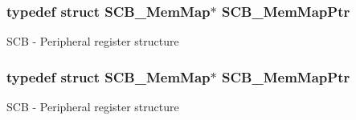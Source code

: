 \subsubsection[{\texorpdfstring{S\+C\+B\+\_\+\+Mem\+Map\+Ptr}{SCB_MemMapPtr}}]{\setlength{\rightskip}{0pt plus 5cm}typedef struct {\bf S\+C\+B\+\_\+\+Mem\+Map}$\ast$ {\bf S\+C\+B\+\_\+\+Mem\+Map\+Ptr}}\hypertarget{group___s_c_b___peripheral_ga08aca299c99cac47121d9e64e7b8e1cf}{}\label{group___s_c_b___peripheral_ga08aca299c99cac47121d9e64e7b8e1cf}
S\+CB -\/ Peripheral register structure 
\subsubsection[{\texorpdfstring{S\+C\+B\+\_\+\+Mem\+Map\+Ptr}{SCB_MemMapPtr}}]{\setlength{\rightskip}{0pt plus 5cm}typedef struct {\bf S\+C\+B\+\_\+\+Mem\+Map}$\ast$ {\bf S\+C\+B\+\_\+\+Mem\+Map\+Ptr}}\hypertarget{group___s_c_b___peripheral_ga08aca299c99cac47121d9e64e7b8e1cf}{}\label{group___s_c_b___peripheral_ga08aca299c99cac47121d9e64e7b8e1cf}
S\+CB -\/ Peripheral register structure 
